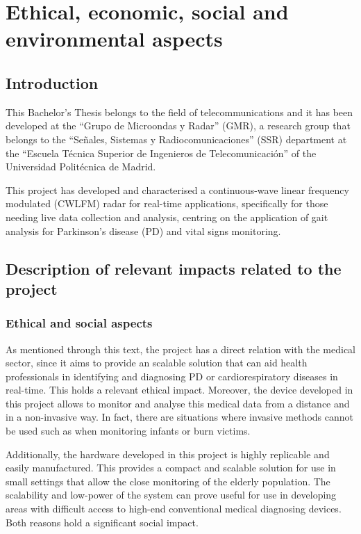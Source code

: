 \chapter{Ethical, economic, social and environmental aspects} \label{app:econ_environ}
\section{Introduction}
This Bachelor's Thesis belongs to the field of telecommunications and it has been developed at the ``Grupo de Microondas y Radar'' (GMR), a research group that belongs to the ``Señales, Sistemas y Radiocomunicaciones'' (SSR) department at the ``Escuela Técnica Superior de Ingenieros de Telecomunicación'' of the Universidad Politécnica de Madrid.

This project has developed and characterised a continuous-wave linear frequency modulated (CWLFM) radar for real-time applications, specifically for those needing live data collection and analysis, centring on the application of gait analysis for Parkinson's disease (PD) and vital signs monitoring.

\section{Description of relevant impacts related to the project}
\subsection{Ethical and social aspects}

As mentioned through this text, the project has a direct relation with the medical sector, since it aims to provide an scalable solution that can aid health professionals in identifying and diagnosing PD or cardiorespiratory diseases in real-time. This holds a relevant ethical impact. Moreover, the device developed in this project allows to monitor and analyse this medical data from a distance and in a non-invasive way. In fact, there are situations where invasive methods cannot be used such as when monitoring infants or burn victims.

Additionally, the hardware developed in this project is highly replicable and easily manufactured. This provides a compact and scalable solution for use in small settings that allow the close monitoring of the elderly population. The scalability and low-power of the system can prove useful for use in developing areas with difficult access to high-end conventional medical diagnosing devices. Both reasons hold a significant social impact.


